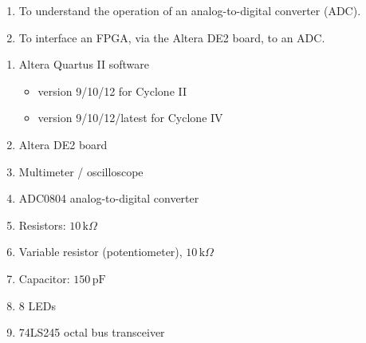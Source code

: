 
\begin{objectives}
  \begin{enumerate}
    \item To understand the operation of an analog-to-digital converter (ADC).
    \item To interface an FPGA, via the Altera DE2 board, to an ADC.
  \end{enumerate}
\end{objectives}

\begin{equipment}
  \begin{enumerate}
    \item Altera Quartus II software
          \begin{itemize}
            \item version 9/10/12 for Cyclone II
            \item version 9/10/12/latest for Cyclone IV
          \end{itemize}
    \item Altera DE2 board
    \item Multimeter / oscilloscope
    \item ADC0804 analog-to-digital converter
    \item Resistors: $10\,\text{k}\Omega$
    \item Variable resistor (potentiometer), $10\,\text{k}\Omega$
    \item Capacitor: $150\,\text{pF}$
    \item 8 LEDs
    \item 74LS245 octal bus transceiver
  \end{enumerate}
\end{equipment}

